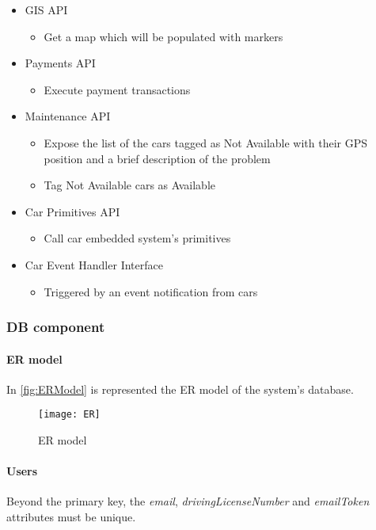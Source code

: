 \begin{itemize}
	\item GIS API
	\begin{itemize}
		\item Get a map which will be populated with markers
	\end{itemize}
	
	\item Payments API
	\begin{itemize}
		\item Execute payment transactions
	\end{itemize}
	
	\item Maintenance API
	\begin{itemize}
		\item Expose the list of the cars tagged as Not Available with their GPS position and a brief description of the problem
		\item Tag Not Available cars as Available
	\end{itemize}
	
	\item Car Primitives API
	\begin{itemize}
		\item Call car embedded system's primitives
	\end{itemize}
	
	\item Car Event Handler Interface
	\begin{itemize}
		\item Triggered by an event notification from cars
	\end{itemize}
\end{itemize}
\clearpage

\subsubsection{DB component}
\paragraph{ER model}In \autoref{fig:ERModel} is represented the ER model of the system's database.

\begin{figure}[h!]
	\centering
	\texttt{[image: ER]}
	\caption{
		\label{fig:ERModel} 
		ER model
	}
\end{figure}

\paragraph{Users} Beyond the primary key, the \mbox{\emph{email}}, \mbox{\emph{drivingLicenseNumber}} and \mbox{\emph{emailToken}} attributes must be unique.

